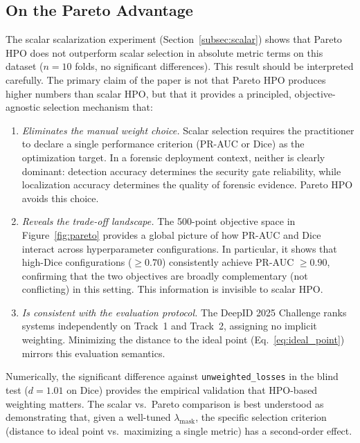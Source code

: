 \subsection{On the Pareto Advantage}

The scalar scalarization experiment (Section~\ref{subsec:scalar}) shows that
Pareto HPO does not outperform scalar selection in absolute metric terms on this
dataset ($n = 10$ folds, no significant differences). This result should be
interpreted carefully. The primary claim of the paper is not that Pareto HPO
produces higher numbers than scalar HPO, but that it provides a principled,
objective-agnostic selection mechanism that:

\begin{enumerate}
  \item \textit{Eliminates the manual weight choice.} Scalar selection requires
  the practitioner to declare a single performance criterion (PR-AUC or Dice)
  as the optimization target. In a forensic deployment context, neither is
  clearly dominant: detection accuracy determines the security gate reliability,
  while localization accuracy determines the quality of forensic evidence.
  Pareto HPO avoids this choice.

  \item \textit{Reveals the trade-off landscape.} The 500-point objective space
  in Figure~\ref{fig:pareto} provides a global picture of how PR-AUC and Dice
  interact across hyperparameter configurations. In particular, it shows that
  high-Dice configurations ($\geq 0.70$) consistently achieve PR-AUC $\geq 0.90$,
  confirming that the two objectives are broadly complementary (not conflicting)
  in this setting. This information is invisible to scalar HPO.

  \item \textit{Is consistent with the evaluation protocol.} The DeepID 2025
  Challenge ranks systems independently on Track~1 and Track~2, assigning no
  implicit weighting. Minimizing the distance to the ideal point (Eq.~\ref{eq:ideal_point})
  mirrors this evaluation semantics.
\end{enumerate}

Numerically, the significant difference against \texttt{unweighted\_losses} in the
blind test ($d = 1.01$ on Dice) provides the empirical validation that HPO-based
weighting matters. The scalar vs.\ Pareto comparison is best understood as
demonstrating that, given a well-tuned $\lambda_{\text{mask}}$, the specific
selection criterion (distance to ideal point vs.\ maximizing a single metric)
has a second-order effect.

